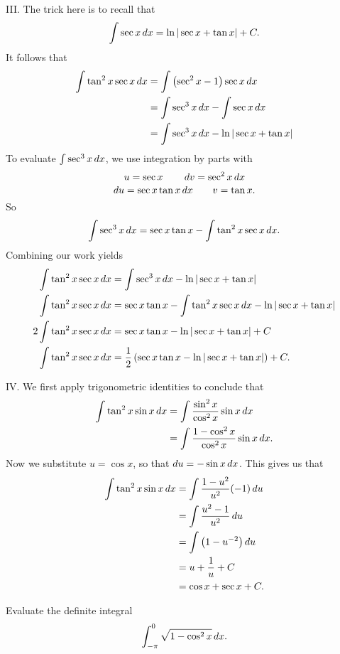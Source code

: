 \documentclass[]{ximera}
\begin{document}
\begin{freeResponse}
III. The trick here is to recall that 
$$
\int \sec x \mathop{}\!d x = \ln | \sec x + \tan x| + C.
$$
It follows that
\begin{align*}
		\int \tan^2 x \sec x \mathop{}\!d x &= \int \left( \sec^2 x - 1 \right) \sec x \mathop{}\!d x  	\\
		&= \int \sec^3 x \mathop{}\!d x - \int \sec x \mathop{}\!d x  	\\
		&= \int \sec^3 x \mathop{}\!d x - \ln | \sec x + \tan x| 
		\end{align*}
	To evaluate $\int \sec^3 x \mathop{}\!d x$, we use integration by parts with
		{
		\[
		u = \sec x 				\qquad	\mathop{}\!d v = \sec^2 x \mathop{}\!d x
		\]
		\[
		\mathop{}\!d u = \sec x \tan x \mathop{}\!d x	\qquad	v = \tan x.
		\]
		}
	So
		\begin{equation}\label{equation 2}
		\int \sec^3 x \mathop{}\!d x = \sec x \tan x - \int \tan^2 x \sec x \mathop{}\!d x.
		\end{equation}
	Combining our work yields
		\begin{align*}
		\int \tan^2 x \sec x \mathop{}\!d x &= \int \sec^3 x \mathop{}\!d x - \ln | \sec x + \tan x|   \\
		\int \tan^2 x \sec x \mathop{}\!d x &= \sec x \tan x - \int \tan^2 x \sec x \mathop{}\!d x - \ln | \sec x + \tan x |  \\
		2 \int \tan^2 x \sec x \mathop{}\!d x &= \sec x \tan x - \ln | \sec x + \tan x | + C  \\
		\int \tan^2 x \sec x \mathop{}\!d x &= \frac{1}{2} \left( \sec x \tan x - \ln | \sec x + \tan x | \right) + C.
		\end{align*}
		
		IV. We first apply trigonometric identities to conclude that
		\begin{align*}
		\int \tan^2 x \sin x \mathop{}\!d x
		&= \int \frac{\sin^2 x}{\cos^2 x} \sin x \mathop{}\!d x  \\
		&= \int \frac{1-\cos^2 x}{\cos^2 x} \sin x \mathop{}\!d x.
		\end{align*}
	Now we substitute $u = \cos x $, so that $\mathop{}\!d u = - \sin x \mathop{}\!d x$. This gives us that
		\begin{align*}
		\int \tan^2 x \sin x \mathop{}\!d x &= \int \frac{1-u^2}{u^2} (-1) \mathop{}\!d u  \\
		&= \int \frac{u^2 - 1}{u^2} \mathop{}\!d u  \\
		&= \int \left( 1 - u^{-2} \right) \mathop{}\!d u  \\
		&= u + \frac{1}{u} + C  \\
		&= \cos x + \sec x + C.
		\end{align*}
\end{freeResponse}

\begin{problem}
Evaluate the definite integral
$$
\int_{- \pi}^0 \sqrt{1 - \cos^2 x} \mathop{}\!d x.
$$
\end{problem}
\end{document}
